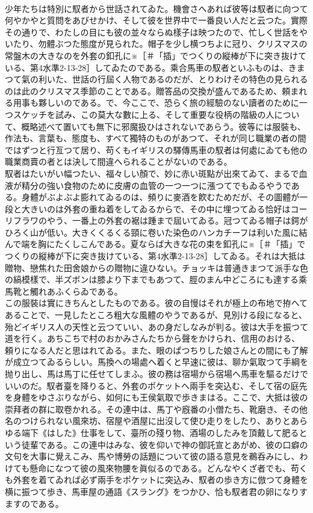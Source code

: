 \documentclass[8pt]{extreport}
\begin{document}
\begin{CJK}{UTF8}{min}
\\	少年たちは特別に馭者から世話されてゐた。機會さへあれば彼等は馭者に向つて何やかやと質問をあびせかけ、そして彼を世界中で一番良い人だと云つた。實際その通りで、わたしの目にも彼の並々ならぬ樣子は映つたので、忙しく世話をやいたり、勿體ぶつた態度が見られた。帽子を少し横つちよに冠り、クリスマスの常盤木の大きなのを外套の釦孔に※［＃「插」でつくりの縦棒が下に突き抜けている、第4水準2-13-28］してゐたのである。乘合馬車の馭者といふものは、きまつて氣の利いた、世話の行屆く人物であるのだが、とりわけその特色の見られるのは此のクリスマス季節のことである。贈答品の交換が盛んであるため、頼まれる用事も夥しいのである。で、今ここで、恐らく旅の經驗のない讀者のために一つスケッチを試み、この莫大な數に上る、そして重要な役柄の階級の人について、概略述べて置いても無下に邪魔扱ひはされないであらう。彼等には服裝も、作法も、言葉も、態度も、すべて獨特のものがあつて、それが同じ職業の者の間ではずつと行亙つて居り、苟くもイギリスの驛傳馬車の馭者は何處にゐても他の職業商賣の者とは決して間違へられることがないのである。
\\	馭者はたいがい幅つたい、福々しい顏で、妙に赤い斑點が出來てゐて、まるで血液が精分の強い食物のために皮膚の血管の一つ一つに漲つてでもゐるやうである。身體がぶよぶよ膨れてゐるのは、頻りに麥酒を飮むためだが、その圖體が一段と大きいのは外套の重ね着をしてゐるからで、その中に埋つてゐる恰好はコーリフラワのやう、一番上の外套の裾は踵まで屆いてゐる。冠つてゐる帽子は鍔がひろく山が低い。大きくくるくる頸に卷いた染色のハンカチーフは利いた風に結んで端を胸にたくしこんである。夏ならば大きな花の束を釦孔に※［＃「插」でつくりの縦棒が下に突き抜けている、第4水準2-13-28］してゐる。それは大抵は贈物、戀焦れた田舍娘からの贈物に違ひない。チョッキは普通きまつて派手な色の縞模樣で、半ズボンは膝より下までもあつて、脛のまん中どころにも達する乘馬靴と觸れあふくらゐである。
\\	この服裝は實にきちんとしたものである。彼の自慢はそれが極上の布地で拵へてあることで、一見したところ粗大な風體のやうであるが、見別ける段になると、殆どイギリス人の天性と云つていい、あの身だしなみが判る。彼は大手を振つて道を行く。あちこちで村のおかみさんたちから聲をかけられ、信用のおける、頼りになる人だと思はれてゐる。また、眼のぱつちりした娘さんとの間にも了解が成立つてゐるらしい。馬換への場處へ着くと早速に彼は、聊か氣取つて手綱を抛り出し、馬は馬丁に任せてしまふ。彼の務は宿場から宿場へ馬車を驅るだけでいいのだ。馭者臺を降りると、外套のポケットへ兩手を突込む、そして宿の庭先を身體をゆさぶりながら、如何にも王侯氣取で歩きまはる。ここで、大抵は彼の崇拜者の群に取卷かれる。その連中は、馬丁や廐番の小僧たち、靴磨き、その他名のつけられない風來坊、宿屋や酒屋に出沒して使ひ走りをしたり、ありとあらゆる端下《はした》仕事をして、臺所の殘り物、酒場のしたみを頂戴して肥るという徒輩である。この連中はみな、彼を仰いで神の御託宣とあがめ、彼の口癖の文句を大事に覺えこみ、馬や博勞の話題について彼の語る意見を鵜呑みにし、わけても懸命になつて彼の風來物腰を眞似るのである。どんなやくざ者でも、苟くも外套を着てゐれば必ず兩手をポケットに突込み、馭者の歩き方に倣つて身體を横に振つて歩き、馬車屋の通語《スラング》をつかひ、恰も馭者君の卵になりすますのである。

\end{CJK}
\end{document}
